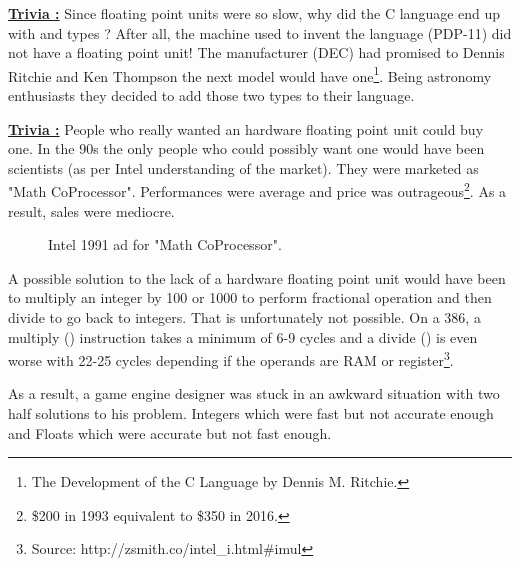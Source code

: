 \documentclass[book.tex]{subfiles}
\begin{document}
 \textbf{\underline{Trivia :}} Since floating point units were so slow, why did the C language end up with  and  types ? After all, the machine used to invent the language (PDP-11) did not have a floating point unit! The manufacturer (DEC) had promised to Dennis Ritchie and Ken Thompson the next model would have one\footnote{The Development of the C Language by Dennis M. Ritchie.}. Being astronomy enthusiasts they decided to add those two types to their language.\\
\par


\textbf{\underline{Trivia :}} People who really wanted an hardware floating point unit could buy one. In the 90s the only people who could possibly want one would have been scientists (as per Intel understanding of the market). They were marketed as "Math CoProcessor". Performances were average and price was outrageous\footnote{\$200 in 1993 equivalent to \$350 in 2016.}. As a result, sales were mediocre.\\
\begin{figure}[H]
\centering
\caption{Intel 1991 ad for "Math CoProcessor".}
\label{fig:fp_internals}
\end{figure}



\par
A possible solution to the lack of a hardware floating point unit would have been to multiply an integer by 100 or 1000 to perform fractional operation and then divide to go back to integers. That is unfortunately not possible. On a 386, a multiply () instruction takes a minimum of 6-9 cycles and a divide () is even worse with 22-25 cycles depending if the operands are RAM or register\footnote{Source: http://zsmith.co/intel\_i.html\#imul}.\\ 
\par
As a result, a game engine designer was stuck in an awkward situation with two half solutions to his problem. Integers which were fast but not accurate enough and Floats which were accurate but not fast enough.\\
\par
  
\end{document}
